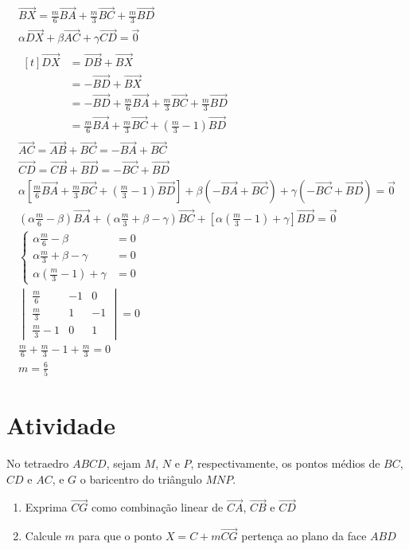 \documentclass[brazilian, fleqn]{article}
\renewcommand{\vec}[1]{\overrightarrow{#1}}
\begin{document}
\begin{gather}
    \vec{BX}=\frac{m}{6}\vec{BA}+\frac{m}{3}\vec{BC}+\frac{m}{3}\vec{BD}\\
    \alpha \vec{DX}+\beta \vec{AC}+\gamma \vec{CD} = \vec{0} \\
    \begin{aligned}[t]
        \vec{DX}&=\vec{DB}+\vec{BX}\\
                &=-\vec{BD}+\vec{BX}\\
                &=-\vec{BD}+\frac{m}{6}\vec{BA}+\frac{m}{3}\vec{BC}+\frac{m}{3}\vec{BD}\\
                &=\frac{m}{6}\vec{BA}+\frac{m}{3}\vec{BC}+\left(\frac{m}{3}-1\right)\vec{BD}
    \end{aligned} \\
    \vec{AC}=\vec{AB}+\vec{BC}=-\vec{BA}+\vec{BC}\\
    \vec{CD}=\vec{CB}+\vec{BD}=-\vec{BC}+\vec{BD}\\
    \alpha \left[\frac{m}{6}\vec{BA}+\frac{m}{3}\vec{BC}+\left(\frac{m}{3}-1\right)\vec{BD}\right]+
    \beta \left(-\vec{BA}+\vec{BC}\right)+ \gamma \left(-\vec{BC}+\vec{BD}\right) = \vec{0} \\
    \left(\alpha\frac{m}{6}-\beta\right)\vec{BA}+\left(\alpha\frac{m}{3}+\beta-\gamma\right)\vec{BC}+
    \left[\alpha\left(\frac{m}{3}-1\right)+\gamma\right]\vec{BD}=\vec{0} \\
    \begin{cases}
        \alpha\frac{m}{6}-\beta &=0 \\
        \alpha\frac{m}{3}+\beta-\gamma &=0 \\
        \alpha\left(\frac{m}{3}-1\right)+\gamma &=0
    \end{cases} \\
    \begin{vmatrix}
        \frac{m}{6} & -1 & 0 \\
        \frac{m}{3} & 1 & -1 \\
        \frac{m}{3}-1 & 0 & 1
    \end{vmatrix} = 0 \\
    \frac{m}{6}+\frac{m}{3}-1+\frac{m}{3}=0 \\
    m=\frac{6}{5}
\end{gather}

\section{Atividade}

No tetraedro \(ABCD\), sejam \(M\), \(N\) e \(P\), respectivamente,
os pontos médios de \(BC\), \(CD\) e \(AC\), e \(G\) o baricentro do triângulo \(MNP\).
\begin{enumerate}
    \item Exprima \(\vec{CG}\) como combinação linear de \(\vec{CA}\), \(\vec{CB}\) e \(\vec{CD}\)
    \item Calcule \(m\) para que o ponto \(X=C+m\vec{CG}\) pertença ao plano da face \(ABD\)
\end{enumerate}
\end{document}
